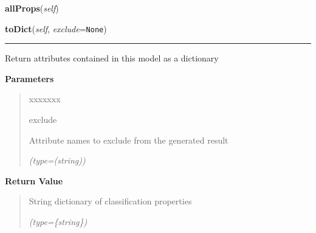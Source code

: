     \label{src:dao:model:outgoing_autonomous:outgoing_autonomous:allProps}

    \vspace{0.5ex}

\hspace{.8\funcindent}\begin{boxedminipage}{\funcwidth}

    \raggedright \textbf{allProps}(\textit{self})

\setlength{\parskip}{2ex}
\setlength{\parskip}{1ex}
    \end{boxedminipage}

    \label{src:dao:model:outgoing_autonomous:outgoing_autonomous:toDict}

    \vspace{0.5ex}

\hspace{.8\funcindent}\begin{boxedminipage}{\funcwidth}

    \raggedright \textbf{toDict}(\textit{self}, \textit{exclude}={\tt None})

    \vspace{-1.5ex}

    \rule{\textwidth}{0.5\fboxrule}
\setlength{\parskip}{2ex}
    Return attributes contained in this model as a dictionary

\setlength{\parskip}{1ex}
      \textbf{Parameters}
      \vspace{-1ex}

      \begin{quote}
        \begin{Ventry}{xxxxxxx}

          \item[exclude]

          Attribute names to exclude from the generated result

            {\it (type=(string))}

        \end{Ventry}

      \end{quote}

      \textbf{Return Value}
    \vspace{-1ex}

      \begin{quote}
      String dictionary of classification properties

      {\it (type=\{string\})}

      \end{quote}

    \end{boxedminipage}


